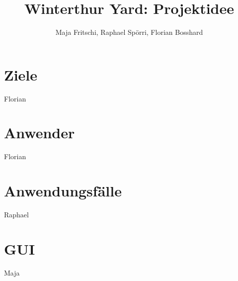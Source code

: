 \documentclass[11pt]{article}
\title{Winterthur Yard: Projektidee}
\author{Maja Fritschi, Raphael Spörri, Florian Bosshard}
\date{}
\begin{document}
\maketitle

\section{Ziele}
Florian

\section{Anwender}
Florian

\section{Anwendungsfälle}
Raphael

\section{GUI}
Maja
\end{document}

